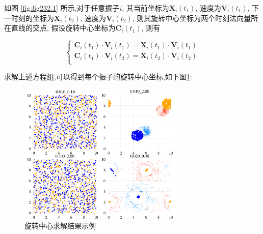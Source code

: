 \documentclass{article}
\begin{document}
如图 \ref{fig:fig232.1} 所示,对于任意振子$i$, 其当前坐标为$\mathbf{X}_i\left( t_1 \right)$, 速度为$\mathbf{V}_i\left( t_1 \right)$, 下一时刻的坐标为$\mathbf{X}_i\left( t_2 \right)$, 速度为$\mathbf{V}_i\left( t_2 \right)$, 则其旋转中心坐标为两个时刻法向量所在直线的交点, 假设旋转中心坐标为$\mathbf{C}_i\left( t_1 \right)$, 则有

\vspace{-0.5cm}

$$
\begin{cases}
	\mathbf{C}_i\left( t_1 \right) \cdot \mathbf{V}_i\left( t_1 \right) =\mathbf{X}_i\left( t_1 \right) \cdot \mathbf{V}_i\left( t_1 \right) \\
	\mathbf{C}_i\left( t_1 \right) \cdot \mathbf{V}_i\left( t_2 \right) =\mathbf{X}_i\left( t_2 \right) \cdot \mathbf{V}_i\left( t_2 \right) \\
\end{cases}
$$



求解上述方程组,可以得到每个振子的旋转中心坐标,如下图\ref{fig:fig232.2}:%

\begin{figure}[H]
	\centering
	\includegraphics[width=0.7\textwidth]{./figs/centorsBigGraph_sub.png}
	\vspace{-0.2cm}
	\caption{旋转中心求解结果示例}
	\label{fig:fig232.2}
\end{figure}
\end{document}
